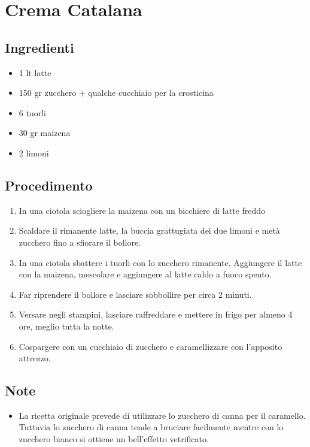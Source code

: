 \section{Crema Catalana}
\subsection{Ingredienti}
\begin{itemize}
\item 1 lt latte  
\item 150 gr zucchero + qualche cucchiaio per la crosticina  
\item 6 tuorli  
\item 30 gr maizena  
\item 2 limoni 
\end{itemize}
\subsection{Procedimento}
\begin{enumerate}
\item  In una ciotola sciogliere la maizena con un bicchiere di latte freddo  
\item  Scaldare il rimanente latte, la buccia grattugiata dei due limoni e metà zucchero fino a sfiorare il bollore.  
\item  In una ciotola sbattere i tuorli con lo zucchero rimanente. Aggiungere il latte con la maizena, mescolare e aggiungere al latte caldo a fuoco spento.  
\item  Far riprendere il bollore e lasciare sobbollire per circa 2 minuti.  
\item  Versare negli stampini, lasciare raffreddare e mettere in frigo per almeno 4 ore, meglio tutta la notte.  
\item  Cospargere con un cucchiaio di zucchero e caramellizzare con l'apposito attrezzo.
\end{enumerate}
\subsection{Note}
\begin{itemize}
\item La ricetta originale prevede di utilizzare lo zucchero di canna per il caramello. Tuttavia lo zucchero di canna tende a bruciare facilmente mentre con lo zucchero bianco si ottiene un bell'effetto vetrificato.
\end{itemize}

